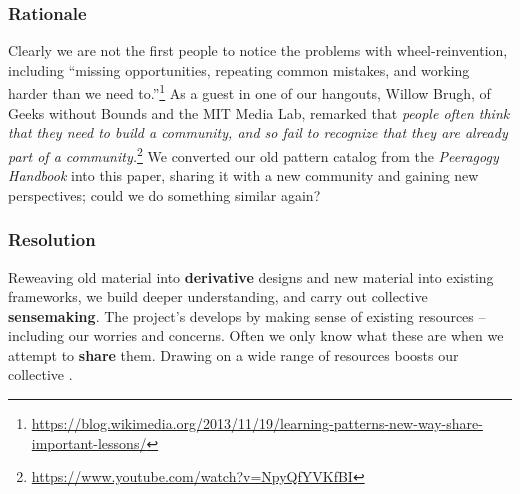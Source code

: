 \subsubsection*{Rationale} 
Clearly we are not the first people to notice the problems with wheel-reinvention, including ``missing opportunities, repeating common mistakes, and working harder than we need to.''\footnote{\url{https://blog.wikimedia.org/2013/11/19/learning-patterns-new-way-share-important-lessons/}}  As a guest in  one of our hangouts, Willow Brugh, of Geeks without Bounds and the MIT Media Lab, remarked that \emph{people often think that they need to build a community, and so fail to recognize that they are already part of a community.}\footnote{\url{https://www.youtube.com/watch?v=NpyQfYVKfBI}}
We converted our old pattern catalog from the \emph{Peeragogy Handbook} into this paper, sharing it with a new community and gaining new perspectives; could we do something similar again?

\subsubsection*{Resolution} Reweaving old material into \textbf{derivative} designs and new material into existing frameworks, we build deeper understanding, and carry out collective \textbf{sensemaking}.
%
The project's  develops by making sense of existing resources -- including our worries and concerns.
Often we only know what these are when we attempt to \textbf{share} them.
Drawing on a wide range of resources boosts our collective .



